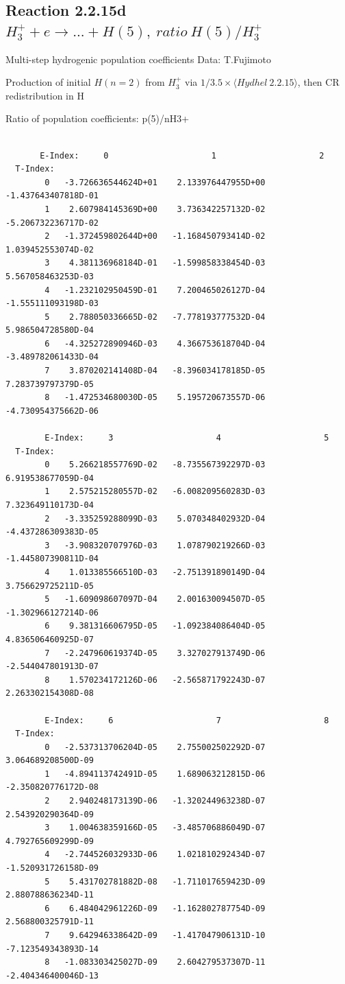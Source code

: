 \documentclass[12pt,dvips]{article}
\begin{document}
\subsection{
Reaction 2.2.15d $ H_3^+ + e \rightarrow ...+ H(5) , \   ratio ~ H(5)/H_3^+  $
}

 Multi-step hydrogenic population coefficients
 Data: T.Fujimoto

 Production of initial $H(n=2)$ from $H_3^+$ via $1/3.5 \times \langle Hydhel~ 2.2.15\rangle$,
 then CR redistribution in H

 Ratio of population coefficients: p(5)/nH3+

\begin{small}\begin{verbatim}

       E-Index:     0                     1                     2
  T-Index:
        0   -3.726636544624D+01    2.133976447955D+00   -1.437643407818D-01
        1    2.607984145369D+00    3.736342257132D-02   -5.206732236717D-02
        2   -1.372459802644D+00   -1.168450793414D-02    1.039452553074D-02
        3    4.381136968184D-01   -1.599858338454D-03    5.567058463253D-03
        4   -1.232102950459D-01    7.200465026127D-04   -1.555111093198D-03
        5    2.788050336665D-02   -7.778193777532D-04    5.986504728580D-04
        6   -4.325272890946D-03    4.366753618704D-04   -3.489782061433D-04
        7    3.870202141408D-04   -8.396034178185D-05    7.283739797379D-05
        8   -1.472534680030D-05    5.195720673557D-06   -4.730954375662D-06

        E-Index:     3                     4                     5
  T-Index:
        0    5.266218557769D-02   -8.735567392297D-03    6.919538677059D-04
        1    2.575215280557D-02   -6.008209560283D-03    7.323649110173D-04
        2   -3.335259288099D-03    5.070348402932D-04   -4.437286309383D-05
        3   -3.908320707976D-03    1.078790219266D-03   -1.445807390811D-04
        4    1.013385566510D-03   -2.751391890149D-04    3.756629725211D-05
        5   -1.609098607097D-04    2.001630094507D-05   -1.302966127214D-06
        6    9.381316606795D-05   -1.092384086404D-05    4.836506460925D-07
        7   -2.247960619374D-05    3.327027913749D-06   -2.544047801913D-07
        8    1.570234172126D-06   -2.565871792243D-07    2.263302154308D-08

        E-Index:     6                     7                     8
  T-Index:
        0   -2.537313706204D-05    2.755002502292D-07    3.064689208500D-09
        1   -4.894113742491D-05    1.689063212815D-06   -2.350820776172D-08
        2    2.940248173139D-06   -1.320244963238D-07    2.543920290364D-09
        3    1.004638359166D-05   -3.485706886049D-07    4.792765609299D-09
        4   -2.744526032933D-06    1.021810292434D-07   -1.520931726158D-09
        5    5.431702781882D-08   -1.711017659423D-09    2.880788636234D-11
        6    6.484042961226D-09   -1.162802787754D-09    2.568800325791D-11
        7    9.642946338642D-09   -1.417047906131D-10   -7.123549343893D-14
        8   -1.083303425027D-09    2.604279537307D-11   -2.404346400046D-13


\end{verbatim}
\end{small}
\end{document}
